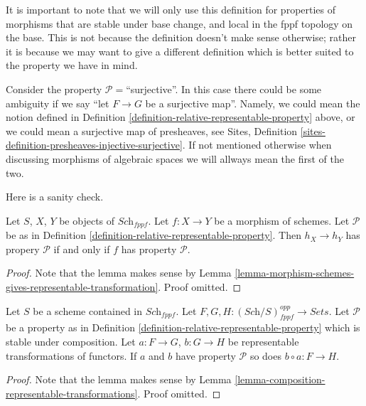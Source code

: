 \noindent
It is important to note that we will only use this definition for
properties of morphisms that are stable under base change, and
local in the fppf topology on the base. This is
not because the definition doesn't make sense otherwise; rather it
is because we may want to give a different definition which is
better suited to the property we have in mind.

\begin{remark}
\label{remark-warning}
Consider the property $\mathcal{P}=$``surjective''.
In this case there could be some ambiguity if we say
``let $F \to G$ be a surjective map''.
Namely, we could mean the notion defined
in Definition \ref{definition-relative-representable-property}
above, or we could mean a surjective map of presheaves, see
Sites, Definition \ref{sites-definition-presheaves-injective-surjective}.
If not mentioned otherwise when
discussing morphisms of algebraic spaces we will allways mean
the first of the two.
\end{remark}

\noindent
Here is a sanity check.

\begin{lemma}
\label{lemma-morphism-schemes-gives-representable-transformation-property}
Let $S$, $X$, $Y$ be objects of $\textit{Sch}_{fppf}$.
Let $f : X \to Y$ be a morphism of schemes.
Let $\mathcal{P}$ be as in
Definition \ref{definition-relative-representable-property}.
Then $h_X \longrightarrow h_Y$ has propery $\mathcal{P}$ if
and only if $f$ has property $\mathcal{P}$.
\end{lemma}

\begin{proof}
Note that the lemma makes sense by
Lemma \ref{lemma-morphism-schemes-gives-representable-transformation}.
Proof omitted.
\end{proof}

\begin{lemma}
\label{lemma-composition-representable-transformations-property}
Let $S$ be a scheme contained in $\textit{Sch}_{fppf}$.
Let $F, G, H : (\textit{Sch}/S)_{fppf}^{opp} \to \textit{Sets}$.
Let $\mathcal{P}$ be a property as in
Definition \ref{definition-relative-representable-property}
which is stable under composition.
Let $a : F \to G$, $b : G \to H$ be representable transformations of functors.
If $a$ and $b$ have property $\mathcal{P}$ so does
$b \circ a : F \longrightarrow H$.
\end{lemma}

\begin{proof}
Note that the lemma makes sense by
Lemma \ref{lemma-composition-representable-transformations}.
Proof omitted.
\end{proof}

